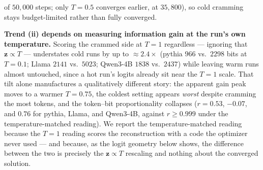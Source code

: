 of $50{,}000$ steps; only $T{=}0.5$ converges earlier, at $35{,}800$), so cold cramming stays budget-limited rather than fully converged.

\textbf{Trend (ii) depends on measuring information gain at the run's own temperature.} Scoring the crammed side at $T{=}1$ regardless --- ignoring that $\mathbf{z}\propto T$ --- understates cold runs by up to ${\approx}2.4\times$ (pythia $966$ vs.\ $2298$ bits at $T{=}0.1$; Llama $2141$ vs.\ $5023$; Qwen3-4B $1838$ vs.\ $2437$) while leaving warm runs almost untouched, since a hot run's logits already sit near the $T{=}1$ scale. That tilt alone manufactures a qualitatively different story: the apparent gain peak moves to a warmer $T{=}0.75$, the coldest setting appears \emph{worst} despite cramming the most tokens, and the token--bit proportionality collapses ($r = 0.53$, $-0.07$, and $0.76$ for pythia, Llama, and Qwen3-4B, against $r \ge 0.999$ under the temperature-matched reading). We report the temperature-matched reading because the $T{=}1$ reading scores the reconstruction with a code the optimizer never used --- and because, as the logit geometry below shows, the difference between the two is precisely the $\mathbf{z}\propto T$ rescaling and nothing about the converged solution.


